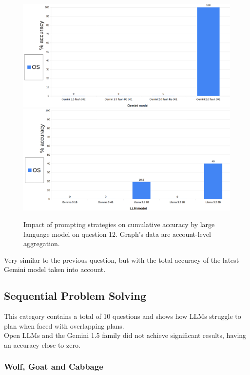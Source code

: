 \documentclass[12pt]{article}
\begin{document}
\begin{figure}[H]
    \centering
            \includegraphics[width=1\textwidth]{q206Gemini.png}
            \includegraphics[width=1\textwidth]{q206Other.png}
    \caption[Accuracy on Question 12 by LLM]{Impact of prompting strategies on cumulative accuracy by large language model on question 12. Graph's data are account-level aggregation.}
    \end{figure} 
Very similar to the previous question, but with the total accuracy of the latest Gemini model taken into account.\\

\vspace{2cm}

\subsection{Sequential Problem Solving}
This category contains a total of 10 questions and shows how LLMs struggle to plan when faced with overlapping plans.\\
Open LLMs and the Gemini 1.5 family did not achieve significant results, having an accuracy close to zero.\\

\subsubsection{Wolf, Goat and Cabbage} %
\end{document}
